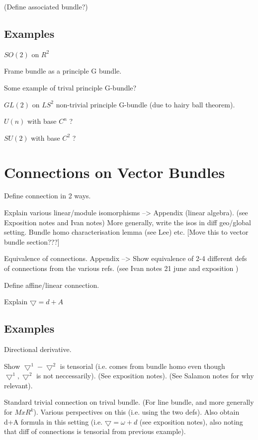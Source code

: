 \documentclass[a4paper]{article}
\theoremstyle{definition} \newtheorem*{definition}{Definition}
\theoremstyle{definition} \newtheorem*{definitions}{Definitions}
\theoremstyle{plain} \newtheorem{theorem}{Theorem}[section]
\theoremstyle{plain} \newtheorem{proposition}[theorem]{Proposition}
\theoremstyle{plain} \newtheorem{corollary}[theorem]{Corollary}
\theoremstyle{plain} \newtheorem{lemma}[theorem]{Lemma}
\theoremstyle{plain} \newtheorem{example}[theorem]{Example}
\begin{document}
(Define associated bundle?)

\subsection{Examples}
$SO(2)$ on $R^2$

Frame bundle as a principle G bundle.

Some example of trival principle G-bundle?

$GL(2)$ on $LS^2$ non-trivial principle G-bundle (due to hairy ball theorem).

$U(n)$ with base $C^n$ ?

$SU(2)$ with base $C^2$ ? 

\section{Connections on Vector Bundles}

Define connection in 2 ways.

Explain various linear/module isomorphisms --> Appendix (linear algebra). (see Exposition notes and Ivan notes)
More generally, write the isos in diff geo/global setting. Bundle homo characterisation lemma (see Lee) etc. [Move this to vector bundle section???] 

Equivalence of connections. 
Appendix --> Show equivalence of 2-4 different defs of connections from the various refs.  (see Ivan notes 21 june and exposition )

Define affine/linear connection.

Explain $\bigtriangledown = d +A$

\subsection{Examples}

Directional derivative.

Show $\bigtriangledown^1 - \bigtriangledown^2$ is tensorial (i.e. comes from bundle homo even though $\bigtriangledown^1,  \bigtriangledown^2$ is not neccessarily). (See exposition notes). (See Salamon notes for why relevant).

Standard trivial connection on trival bundle. (For line bundle, and more generally for $MxR^k$). Various perspectives on this (i.e. using the two defs). Also obtain d+A formula in this setting (i.e. $\bigtriangledown = \omega + d$ (see exposition notes), also noting that diff of connections is tensorial from previous example).
\end{document}
